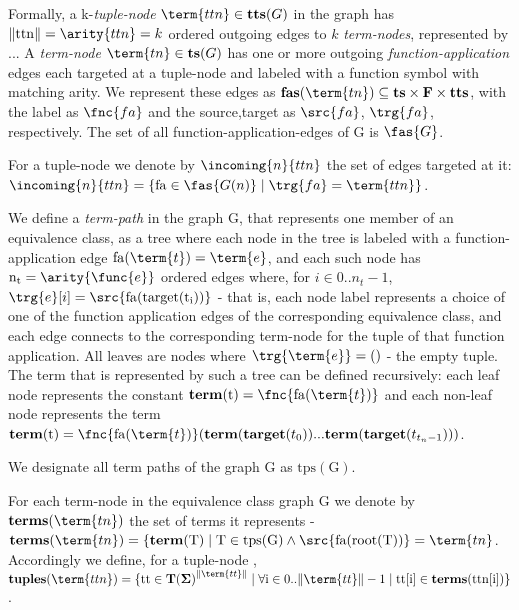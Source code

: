Formally, a k-\emph{tuple-node} $\term{ttn} \in \mathbf{tts}(G)$ in the graph has $\|\mathrm{ttn}\|=\arity{ttn}=k$ ordered outgoing edges to $k$ \emph{term-nodes}, represented by ...
A \emph{term-node} $\term{tn}\in \mathbf{ts}(G)$ has one or more outgoing \emph{function-application} edges each targeted at a tuple-node and labeled with a function symbol with matching arity.
We represent these edges as $\mathbf{fas}(\term{tn}) \subseteq \mathbf{ts} \times \mathbf{F} \times \mathbf{tts}$, with the label as $\fnc{fa}$ and the source,target as $\src{fa}$, $\trg{fa}$, respectively. The set of all function-application-edges of $\mathrm{G}$ is $\fas{G}$.

For a tuple-node  we denote by $\incoming{n}{ttn}$ the set of edges targeted at it: $\incoming{n}{ttn} = \{\mathrm{fa} \in \fas{G(n)} \mid \trg{fa}=\term{ttn} \}$.

We define a \emph{term-path} in the graph $\mathrm{G}$, that represents one member of an equivalence class, as a tree where each node  in the tree is labeled with a function-application edge $\mathrm{fa}(\term{t})=\term{e}$, and each such node has $\mathrm{n_t}=\arity{\func{e}}$ ordered edges  where, for $i \in 0..n_t-1$, $\trg{e}[i]=\src{\mathrm{fa}(\mathrm{target}(\mathrm{t_i}))}$ - that is, each node label represents a choice of one of the function application edges of the corresponding equivalence class, and each edge connects to the corresponding term-node for the tuple of that function application. All leaves are nodes where $\trg{\term{e}}=()$ - the empty tuple.
The term that is represented by such a tree can be defined recursively: each leaf node  represents the constant $\mathbf{term}(\mathrm{t})=\fnc{\mathrm{fa}(\term{t})}$ and each non-leaf node  represents the term $\mathbf{term}(\mathrm{t})=\fnc{\mathrm{fa}(\term{t})}(\mathbf{term}(\mathbf{target}(t_0))...\mathbf{term}(\mathbf{target}(t_{t_n-1})))$.

We designate all term paths of the graph $\mathrm{G}$ as $\mathrm{tps(G)}$.

For each term-node  in the equivalence class graph $\mathrm{G}$ we denote by $\mathbf{terms}(\term{tn})$ the set of terms it represents - $\mathbf{terms}(\term{tn})=\{ \mathbf{term}(\mathrm{T}) \mid \mathrm{T} \in \mathrm{tps(G)} \land \src{\mathrm{fa(root(T))}}=\term{tn}$.\\
Accordingly we define, for a tuple-node ,\\
 $\mathbf{tuples}(\term{ttn})=\{ \mathrm{tt} \in \mathbf{T(\Sigma)}^{\|\term{tt}\|} \mid \forall \mathrm{i} \in 0..\|\term{tt}\|-1 \mid \mathrm{tt}[\mathrm{i}] \in \mathbf{terms}(\mathrm{ttn}[\mathrm{i}]) \}$.


